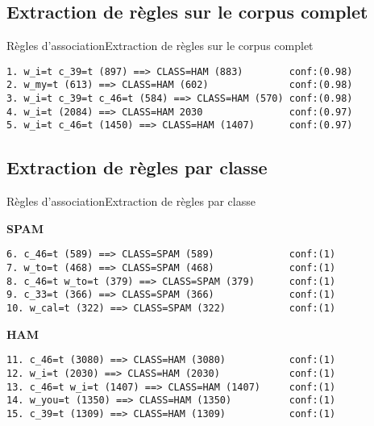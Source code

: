 \subsection{Extraction de règles sur le corpus complet}

\begin{frame}[containsverbatim]{Règles d'association}{Extraction de règles sur le corpus complet}
\scriptsize
\begin{verbatim}
1. w_i=t c_39=t (897) ==> CLASS=HAM (883)        conf:(0.98)
2. w_my=t (613) ==> CLASS=HAM (602)              conf:(0.98)
3. w_i=t c_39=t c_46=t (584) ==> CLASS=HAM (570) conf:(0.98)
4. w_i=t (2084) ==> CLASS=HAM 2030               conf:(0.97)
5. w_i=t c_46=t (1450) ==> CLASS=HAM (1407)      conf:(0.97)
\end{verbatim}
\end{frame}

\subsection{Extraction de règles par classe}

\begin{frame}[containsverbatim]{Règles d'association}{Extraction de règles par classe}

\textbf{SPAM}
\scriptsize
\begin{verbatim}
6. c_46=t (589) ==> CLASS=SPAM (589)             conf:(1)
7. w_to=t (468) ==> CLASS=SPAM (468)             conf:(1)
8. c_46=t w_to=t (379) ==> CLASS=SPAM (379)      conf:(1)
9. c_33=t (366) ==> CLASS=SPAM (366)             conf:(1)
10. w_cal=t (322) ==> CLASS=SPAM (322)           conf:(1)
\end{verbatim}

\normalsize
\textbf{HAM}
\scriptsize
\begin{verbatim}
11. c_46=t (3080) ==> CLASS=HAM (3080)           conf:(1)
12. w_i=t (2030) ==> CLASS=HAM (2030)            conf:(1)
13. c_46=t w_i=t (1407) ==> CLASS=HAM (1407)     conf:(1)
14. w_you=t (1350) ==> CLASS=HAM (1350)          conf:(1)
15. c_39=t (1309) ==> CLASS=HAM (1309)           conf:(1)
\end{verbatim}

\end{frame}
